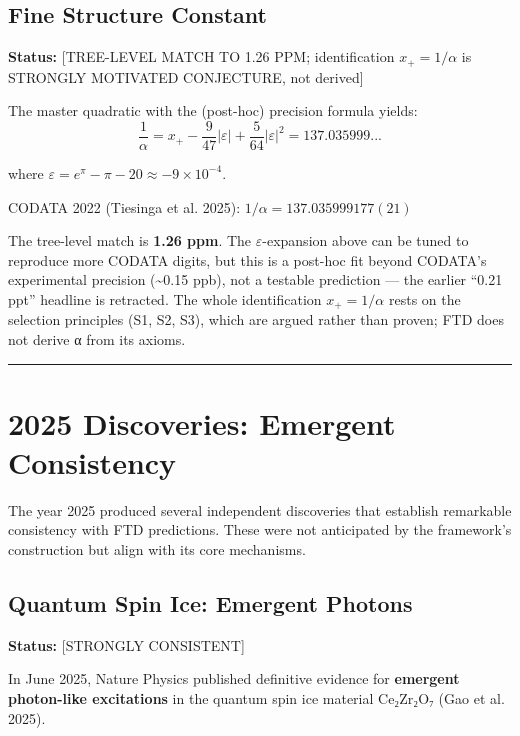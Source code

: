 \documentclass[
  11pt,
  letterpaper,
  twoside,
  openright]{book}
\begin{document}
\subsection{Fine Structure Constant}\label{fine-structure-constant-1}

\textbf{Status:} {[}TREE-LEVEL MATCH TO 1.26 PPM; identification
\(x_+=1/\alpha\) is STRONGLY MOTIVATED CONJECTURE, not derived{]}

The master quadratic with the (post-hoc) precision formula yields:
\[\frac{1}{\alpha} = x_+ - \frac{9}{47}|\varepsilon| + \frac{5}{64}|\varepsilon|^2 = 137.035999...\]

where \(\varepsilon = e^\pi - \pi - 20 \approx -9 \times 10^{-4}\).

CODATA 2022 (Tiesinga et al. 2025): \(1/\alpha = 137.035999177(21)\)

The tree-level match is \textbf{1.26 ppm}. The \(\varepsilon\)-expansion
above can be tuned to reproduce more CODATA digits, but this is a
post-hoc fit beyond CODATA's experimental precision (\textasciitilde0.15
ppb), not a testable prediction --- the earlier ``0.21 ppt'' headline is
retracted. The whole identification \(x_+ = 1/\alpha\) rests on the
selection principles (S1, S2, S3), which are argued rather than proven;
FTD does not derive α from its axioms.

\begin{center}\rule{0.5\linewidth}{0.5pt}\end{center}

\section{2025 Discoveries: Emergent
Consistency}\label{sec-2025-discoveries}

The year 2025 produced several independent discoveries that establish
remarkable consistency with FTD predictions. These were not anticipated
by the framework's construction but align with its core mechanisms.

\subsection{Quantum Spin Ice: Emergent
Photons}\label{sec-quantum-spin-ice}

\textbf{Status:} {[}STRONGLY CONSISTENT{]}

In June 2025, Nature Physics published definitive evidence for
\textbf{emergent photon-like excitations} in the quantum spin ice
material Ce₂Zr₂O₇ (Gao et al. 2025).
\end{document}
